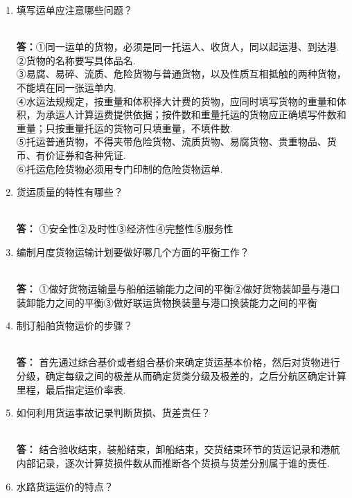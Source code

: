 \documentclass[UTF8]{ctexart}
\begin{document}
\begin{enumerate}[1]
\begin{CJK}{UTF8}{you}
\end{CJK}
 \textbf{答：} 以综合基价确定的运价为均衡里程运价，以组合基价确定的运价为递远递减运价.
\item \begin{CJK}{UTF8}{you} 填写运单应注意哪些问题？
\end{CJK}
\\ \textbf{答：}①同一运单的货物，必须是同一托运人、收货人，同以起运港、到达港.
\\ ②货物的名称要写具体品名.
\\ ③易腐、易碎、流质、危险货物与普通货物，以及性质互相抵触的两种货物，不能填在同一张运单内.
\\ ④水运法规规定，按重量和体积择大计费的货物，应同时填写货物的重量和体积，为承运人计算运费提供依据；按件数和重量托运的货物应正确填写件数和重量；只按重量托运的货物可只填重量，不填件数.
\\ ⑤托运普通货物，不得夹带危险货物、流质货物、易腐货物、贵重物品、货币、有价证券和各种凭证.
\\ ⑥托运危险货物必须用专门印制的危险货物运单.
\item \begin{CJK}{UTF8}{you} 货运质量的特性有哪些？
\end{CJK}
\\ \textbf{答：} ①安全性②及时性③经济性④完整性⑤服务性
\item \begin{CJK}{UTF8}{you} 编制月度货物运输计划要做好哪几个方面的平衡工作？
\end{CJK}
\\ \textbf{答：} ①做好货物运输量与船舶运输能力之间的平衡②做好货物装卸量与港口装卸能力之间的平衡③做好联运货物换装量与港口换装能力之间的平衡
\item \begin{CJK}{UTF8}{you} 制订船舶货物运价的步骤？
\end{CJK}
\\ \textbf{答：} 首先通过综合基价或者组合基价来确定货运基本价格，然后对货物进行分级，确定每级之间的极差从而确定货类分级及极差的，之后分航区确定计算里程，最后指定运价率表.
\item \begin{CJK}{UTF8}{you} 如何利用货运事故记录判断货损、货差责任？
\end{CJK}
\\ \textbf{答：} 结合验收结束，装船结束，卸船结束，交货结束环节的货运记录和港航内部记录，逐次计算货损件数从而推断各个货损与货差分别属于谁的责任.
\item \begin{CJK}{UTF8}{you} 水路货运运价的特点？

\end{CJK}
\end{enumerate}
\end{document}
